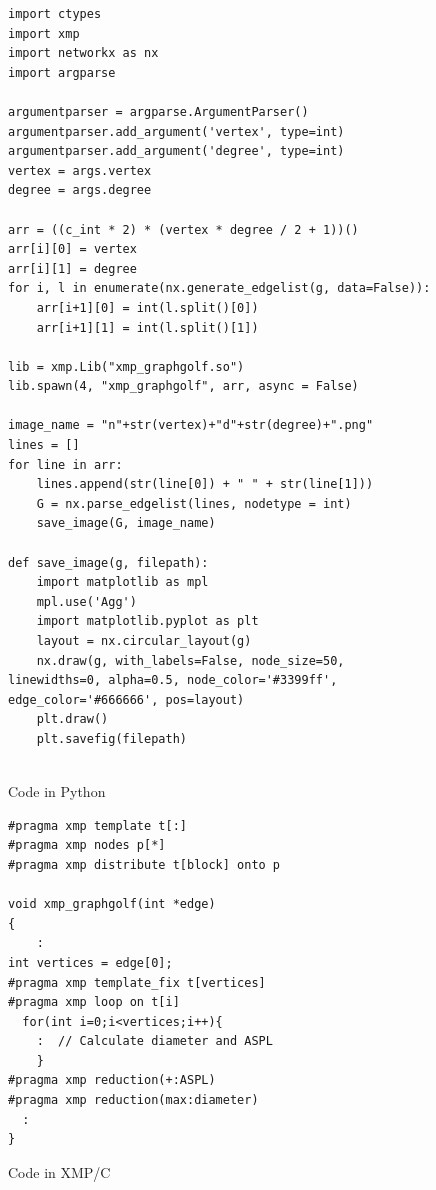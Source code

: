 \documentclass[graybox]{svmult}
\begin{document}
\begin{figure}[t]
\begin{lstlisting}
import ctypes
import xmp 
import networkx as nx
import argparse

argumentparser = argparse.ArgumentParser()
argumentparser.add_argument('vertex', type=int)
argumentparser.add_argument('degree', type=int)
vertex = args.vertex
degree = args.degree

arr = ((c_int * 2) * (vertex * degree / 2 + 1))()
arr[i][0] = vertex
arr[i][1] = degree
for i, l in enumerate(nx.generate_edgelist(g, data=False)):
    arr[i+1][0] = int(l.split()[0])
    arr[i+1][1] = int(l.split()[1])

lib = xmp.Lib("xmp_graphgolf.so")
lib.spawn(4, "xmp_graphgolf", arr, async = False)

image_name = "n"+str(vertex)+"d"+str(degree)+".png"
lines = []
for line in arr:
    lines.append(str(line[0]) + " " + str(line[1]))
    G = nx.parse_edgelist(lines, nodetype = int)
    save_image(G, image_name)

def save_image(g, filepath):
    import matplotlib as mpl
    mpl.use('Agg')
    import matplotlib.pyplot as plt
    layout = nx.circular_layout(g)
    nx.draw(g, with_labels=False, node_size=50, linewidths=0, alpha=0.5, node_color='#3399ff', edge_color='#666666', pos=layout)
    plt.draw()
    plt.savefig(filepath)
        
\end{lstlisting}
\caption{Code in Python} \label{fig:program-python}
\end{figure}

\begin{figure}[t]
\begin{lstlisting}
#pragma xmp template t[:]
#pragma xmp nodes p[*]
#pragma xmp distribute t[block] onto p

void xmp_graphgolf(int *edge)
{
    :
int vertices = edge[0];
#pragma xmp template_fix t[vertices]
#pragma xmp loop on t[i]
  for(int i=0;i<vertices;i++){
    :  // Calculate diameter and ASPL
    }
#pragma xmp reduction(+:ASPL)
#pragma xmp reduction(max:diameter)
  :
}
\end{lstlisting}
\caption{Code in XMP/C} \label{fig:program-xmp}
\end{figure}
\end{document}

